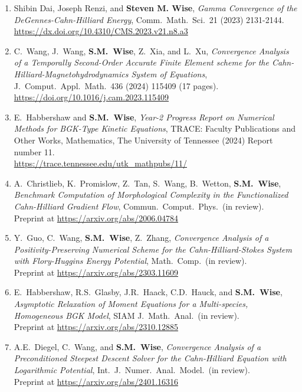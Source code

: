 \documentclass[11pt]{letter}
\begin{document}
\begin{enumerate}
	\item
Shibin Dai, Joseph Renzi, and \textbf{Steven M. Wise}, {\sl Gamma Convergence of the DeGennes-Cahn-Hilliard Energy}, Comm.~Math.~Sci.~21 (2023) 2131-2144. 
	\\
\url{https://dx.doi.org/10.4310/CMS.2023.v21.n8.a3}

	\item
C.~Wang, J.~Wang, \textbf{S.M.~Wise}, Z.~Xia, and L.~Xu, {\sl Convergence Analysis of a Temporally Second-Order Accurate Finite Element scheme for the Cahn-Hilliard-Magnetohydrodynamics System of Equations}, J.~Comput.~Appl.~Math.~436 (2024) 115409 (17 pages).
	\\
\url{https://doi.org/10.1016/j.cam.2023.115409}

	\item
E.~Habbershaw and \textbf{S.M.~Wise}, {\sl Year-2 Progress Report on Numerical Methods for BGK-Type Kinetic Equations}, TRACE: Faculty Publications and Other Works, Mathematics, The University of Tennessee (2024) Report number 11.
 	\\
\url{https://trace.tennessee.edu/utk_mathpubs/11/}

	\item
A.~Christlieb, K.~Promislow, Z.~Tan, S.~Wang, B.~Wetton, \textbf{S.M.~Wise}, {\sl Benchmark Computation of Morphological Complexity in the Functionalized Cahn-Hilliard Gradient Flow}, Commun.~Comput.~Phys.~(in review).
	\\ 
Preprint at \url{https://arxiv.org/abs/2006.04784}

	\item
Y.~Guo, C.~Wang, \textbf{S.M.~Wise}, Z.~Zhang, {\sl Convergence Analysis of a Positivity-Preserving Numerical Scheme for the Cahn-Hilliard-Stokes System with Flory-Huggins Energy Potential}, Math.~Comp.~(in review).
	\\
Preprint at \url{https://arxiv.org/abs/2303.11609}

	\item
E.~Habbershaw, R.S.~Glasby, J.R.~Haack, C.D.~Hauck, and \textbf{S.M.~Wise}, {\sl Asymptotic Relaxation of Moment Equations for a Multi-species, Homogeneous BGK Model}, SIAM J.~Math.~Anal.~(in review).
	\\
Preprint at \url{https://arxiv.org/abs/2310.12885}

	\item
A.E.~Diegel, C.~Wang, and \textbf{S.M.~Wise}, {\sl Convergence Analysis of a Preconditioned Steepest Descent Solver for the Cahn-Hilliard Equation with Logarithmic Potential}, Int.~J.~Numer.~Anal.~Model.~(in review).
	\\
Preprint at \url{https://arxiv.org/abs/2401.16316}



	\end{enumerate}
\end{document}
